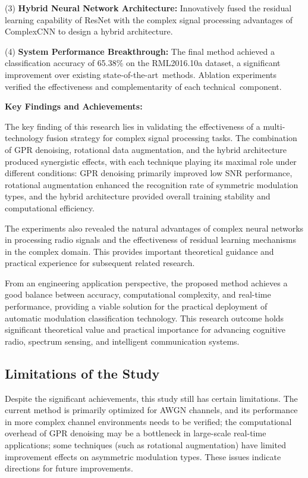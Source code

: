 \documentclass[conference]{IEEEtran}
\begin{document}
(3) \textbf{Hybrid Neural Network Architecture:} Innovatively fused the residual learning capability of ResNet with the complex signal processing advantages of ComplexCNN to design a hybrid architecture.

(4) \textbf{System Performance Breakthrough:} The final method achieved a classification accuracy of 65.38\% on the RML2016.10a dataset, a significant improvement over existing state-of-the-art~methods. Ablation experiments verified the effectiveness and complementarity of each technical~component.

\textbf{Key Findings and Achievements:}

The key finding of this research lies in validating the effectiveness of a multi-technology fusion strategy for complex signal processing tasks. The combination of GPR denoising, rotational data augmentation, and the hybrid architecture produced synergistic effects, with each technique playing its maximal role under different conditions: GPR denoising primarily improved low SNR performance, rotational augmentation enhanced the recognition rate of symmetric modulation types, and the hybrid architecture provided overall training stability and computational efficiency.

The experiments also revealed the natural advantages of complex neural networks in processing radio signals and the effectiveness of residual learning mechanisms in the complex domain. This provides important theoretical guidance and practical experience for subsequent related research.

From an engineering application perspective, the proposed method achieves a good balance between accuracy, computational complexity, and real-time performance, providing a viable solution for the practical deployment of automatic modulation classification technology. This research outcome holds significant theoretical value and practical importance for advancing cognitive radio, spectrum sensing, and intelligent communication systems.

\subsection{Limitations of the Study}

Despite the significant achievements, this study still has certain limitations. The current method is primarily optimized for AWGN channels, and its performance in more complex channel environments needs to be verified; the computational overhead of GPR denoising may be a bottleneck in large-scale real-time applications; some techniques (such as rotational augmentation) have limited improvement effects on asymmetric modulation types. These issues indicate directions for future improvements.
\end{document}
